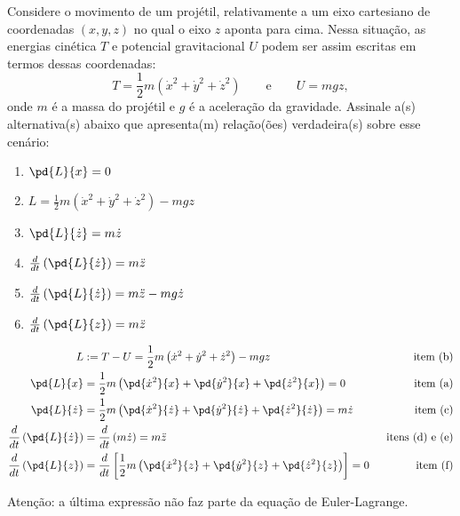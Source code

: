 \begin{question}
    Considere o movimento de um projétil, relativamente a um eixo cartesiano de coordenadas $(x,y,z)$ no qual o eixo $z$ aponta para cima.
    Nessa situação, as energias cinética $T$ e potencial gravitacional $U$ podem ser assim escritas em termos dessas coordenadas:
    \begin{equation*}
      T = \frac{1}{2}m\left(\dot x^2 + \dot y^2 + \dot z^2\right) \qquad\text{e}\qquad
      U = mgz,
    \end{equation*}
    onde $m$ é a massa do projétil e $g$ é a aceleração da gravidade.
    Assinale a(s) alternativa(s) abaixo que apresenta(m) relação(ões) verdadeira(s) sobre esse cenário:
    \begin{enumerate}
      \item $\pd{L}{x} = 0$ \rightanswer
      \item $L = \frac{1}{2}m\left(\dot x^2 + \dot y^2 + \dot z^2\right) - mgz$ \rightanswer
      \item $\pd{L}{\dot z} = m\dot z$ \rightanswer
      \item $\frac{d}{dt}\left(\pd{L}{\dot z}\right) = m\ddot z$ \rightanswer
      \item $\frac{d}{dt}\left(\pd{L}{\dot z}\right) = m\ddot z - mg\dot z$
      \item $\frac{d}{dt}\left(\pd{L}{z}\right) = m\ddot z$
    \end{enumerate}

    \begin{solution}
      \begin{align*}
        L &:= T - U = \frac{1}{2}m\left(\dot x^2 + \dot y^2 + \dot z^2\right) - mgz \qquad &\text{item (b)}\\
        \pd{L}{x} &= \frac{1}{2}m\left(\pd{\dot x^2}{x} + \pd{\dot y^2}{x} + \pd{\dot z^2}{x}\right) = 0 \qquad &\text{item (a)}\\
        \pd{L}{\dot z} &= \frac{1}{2}m\left(\pd{\dot x^2}{\dot z} + \pd{\dot y^2}{\dot z} + \pd{\dot z^2}{\dot z}\right) = m\dot z \qquad &\text{item (c)}\\
        \frac{d}{dt}\left(\pd{L}{\dot z}\right) &= \frac{d}{dt}\left(m\dot z\right) = m\ddot z \qquad &\text{itens (d) e (e)}\\
        \frac{d}{dt}\left(\pd{L}{z}\right) &= \frac{d}{dt}\left[\frac{1}{2}m\left(\pd{\dot x^2}{z} + \pd{\dot y^2}{z} + \pd{\dot z^2}{z}\right)\right] = 0 &\text{item (f)}
      \end{align*}

      Atenção: a última expressão não faz parte da equação de Euler-Lagrange.
    \end{solution}
\end{question}